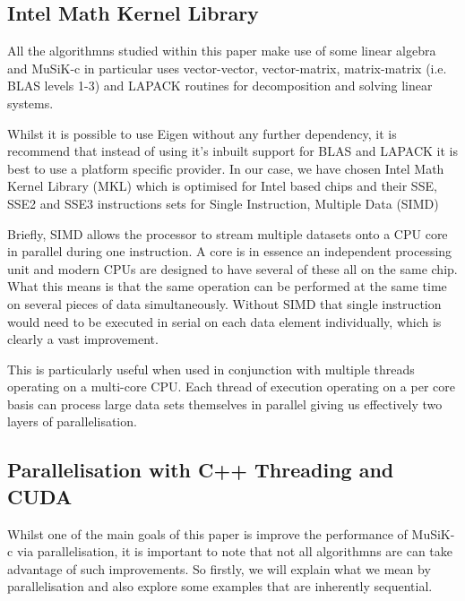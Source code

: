 \documentclass[a4paper]{amsart}
\begin{document}
\subsection{Intel Math Kernel Library}
All the algorithmns studied within this paper make use of some linear algebra and MuSiK-c in particular uses vector-vector, vector-matrix, matrix-matrix (i.e. BLAS levels 1-3) and LAPACK routines for decomposition and solving linear systems.

Whilst it is possible to use Eigen without any further dependency, it is recommend that instead of using it's inbuilt support for BLAS and LAPACK it is best to use a platform specific provider. In our case, we have chosen Intel Math Kernel Library\cite{mkl1} (MKL) which is optimised for Intel based chips\cite{mkl2} and their SSE\cite{mkl4}, SSE2 and SSE3 instructions sets for Single Instruction, Multiple Data\cite{mkl3} (SIMD)

Briefly, SIMD allows the processor to stream multiple datasets onto a CPU core in parallel during one instruction. A core is in essence an independent processing unit and modern CPUs are designed to have several of these all on the same chip. What this means is that the same operation can be performed at the same time on several pieces of data simultaneously. Without SIMD that single instruction would need to be executed in serial on each data element individually, which is clearly a vast improvement.

This is particularly useful when used in conjunction with multiple threads operating on a multi-core CPU. Each thread of execution operating on a per core basis can process large data sets themselves in parallel giving us effectively two layers of parallelisation.



\subsection{Parallelisation with C++ Threading and CUDA}

Whilst one of the main goals of this paper is improve the performance of MuSiK-c via parallelisation, it is important to note that not all algorithmns are can take advantage of such improvements. So firstly, we will explain what we mean by parallelisation and also explore some examples that are inherently sequential. 
\end{document}
